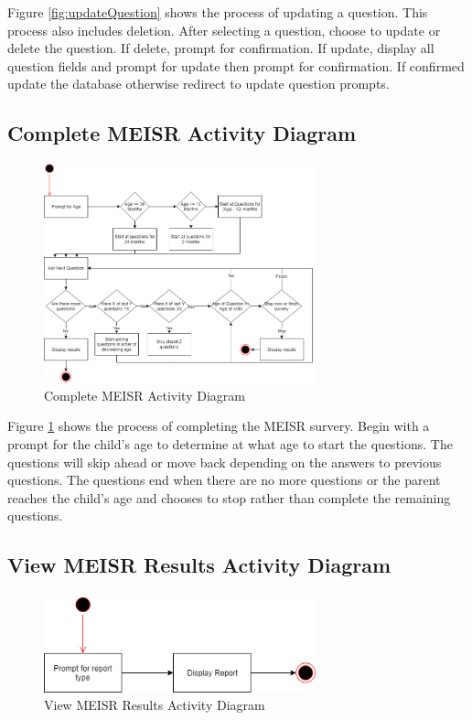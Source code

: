 Figure \ref{fig:updateQuestion} shows the process of updating a question. This process also includes deletion. After selecting a question, choose to update or delete the question. If delete, prompt for confirmation. If update, display all question fields and prompt for update then prompt for confirmation. If confirmed update the database otherwise redirect to update question prompts.

\subsection{Complete MEISR Activity Diagram}

\begin{figure}[h]
  \centering
  \includegraphics[width=0.7\textwidth]{images/Complete_MEISR_Activity_Diagram.png}
  \caption{Complete MEISR Activity Diagram}
  \label{fig:completeMEISR}
\end{figure}

Figure \ref{fig:completeMEISR} shows the process of completing the MEISR survery. Begin with a prompt for the child's age to determine at what age to start the questions. The questions will skip ahead or move back depending on the answers to previous questions. The questions end when there are no more questions or the parent reaches the child's age and chooses to stop rather than complete the remaining questions.

\subsection{View MEISR Results Activity Diagram}

\begin{figure}[h]
  \centering
  \includegraphics[width=0.7\textwidth]{images/View_MEISR_Results_Activity_Diagram.png}
  \caption{View MEISR Results Activity Diagram}
  \label{fig:viewMEISRResults}
\end{figure}
  
